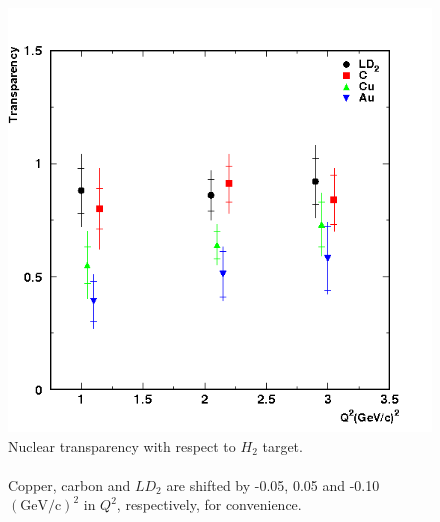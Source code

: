 \begin{figure}[!tbp]
  \centering
  \includegraphics[width=0.8\columnwidth]{transp1}
  \caption[Nuclear transparency with respect to $H_2$ target.]{\label{fig:transp1}Nuclear transparency with respect to $H_2$ target.\\\\ Copper, carbon and $LD_2$ are shifted by -0.05, 0.05 and -0.10 $(\mathrm{GeV/c})^2$ in $Q^2$, respectively, for convenience.}
\end{figure}


%

